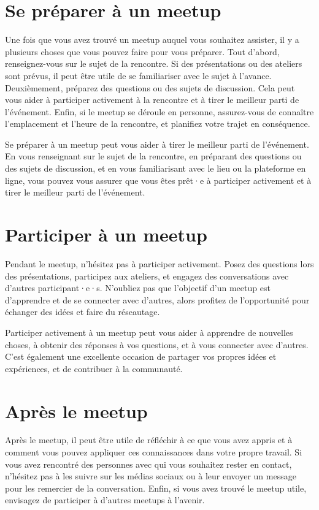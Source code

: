 \section{Se préparer à un meetup}

Une fois que vous avez trouvé un meetup auquel vous souhaitez assister, il y a plusieurs choses que vous pouvez faire pour vous préparer. Tout d'abord, renseignez-vous sur le sujet de la rencontre. Si des présentations ou des ateliers sont prévus, il peut être utile de se familiariser avec le sujet à l'avance. Deuxièmement, préparez des questions ou des sujets de discussion. Cela peut vous aider à participer activement à la rencontre et à tirer le meilleur parti de l'événement. Enfin, si le meetup se déroule en personne, assurez-vous de connaître l'emplacement et l'heure de la rencontre, et planifiez votre trajet en conséquence.

Se préparer à un meetup peut vous aider à tirer le meilleur parti de l'événement. En vous renseignant sur le sujet de la rencontre, en préparant des questions ou des sujets de discussion, et en vous familiarisant avec le lieu ou la plateforme en ligne, vous pouvez vous assurer que vous êtes prêt·e à participer activement et à tirer le meilleur parti de l'événement.

\section{Participer à un meetup}

Pendant le meetup, n'hésitez pas à participer activement. Posez des questions lors des présentations, participez aux ateliers, et engagez des conversations avec d'autres participant·e·s. N'oubliez pas que l'objectif d'un meetup est d'apprendre et de se connecter avec d'autres, alors profitez de l'opportunité pour échanger des idées et faire du réseautage.

Participer activement à un meetup peut vous aider à apprendre de nouvelles choses, à obtenir des réponses à vos questions, et à vous connecter avec d'autres. C'est également une excellente occasion de partager vos propres idées et expériences, et de contribuer à la communauté.

\section{Après le meetup}

Après le meetup, il peut être utile de réfléchir à ce que vous avez appris et à comment vous pouvez appliquer ces connaissances dans votre propre travail. Si vous avez rencontré des personnes avec qui vous souhaitez rester en contact, n'hésitez pas à les suivre sur les médias sociaux ou à leur envoyer un message pour les remercier de la conversation. Enfin, si vous avez trouvé le meetup utile, envisagez de participer à d'autres meetups à l'avenir.

